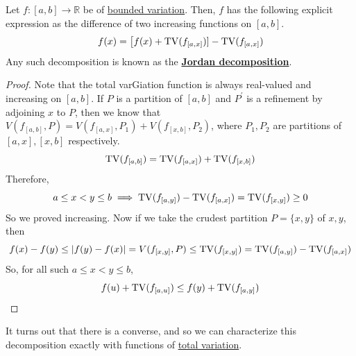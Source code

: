   \begin{lemma}
    \label{thm:construction-of-jordan-decomposition}
    Let $f: [a, b] \to \mathbb{R}$ be of \hyperref[def:bounded-variation]{bounded variation}. Then, $f$ has the following explicit expression as the difference of two increasing functions on $[a, b]$. 
    \begin{equation}
      f(x) = \big[ f(x) + \operatorname{TV} (f_{[a, x]})] - \operatorname{TV} (f_{[a, x]})
    \end{equation}
    Any such decomposition is known as the \textbf{\hyperref[thm:jordan-decomposition-theorem]{Jordan decomposition}}. 
  \end{lemma}
  \begin{proof}
    Note that the total varGiation function is always real-valued and increasing on $[a, b]$. If $P$ is a partition of $[a, b]$ and $P^\prime$ is a refinement by adjoining $x$ to $P$, then we know that $V(f_{[a, b]}, P) = V(f_{[a, x]}, P_1) + V(f_{[x, b]}, P_2)$, where $P_1, P_2$ are partitions of $[a, x], [x, b]$ respectively. 
    \begin{equation}
      \operatorname{TV} (f_{[a, b]}) = \operatorname{TV} (f_{[a, x]}) + \operatorname{TV} (f_{[x, b]})
    \end{equation}
    Therefore, 
    \begin{equation}
      a \leq x < y \leq b \implies \operatorname{TV} (f_{[a, y]}) - \operatorname{TV} (f_{[a, x]}) = \operatorname{TV} (f_{[x, y]}) \geq 0
    \end{equation}
    So we proved increasing. Now if we take the crudest partition $P = \{x, y\}$ of $x, y$, then 
    \begin{equation}
      f(x) - f(y) \leq |f(y) - f(x)| = V(f_{[x, y]}, P) \leq \operatorname{TV} (f_{[x, y]}) = \operatorname{TV}(f_{[a, y]}) - \operatorname{TV}(f_{[a, x]}) 
    \end{equation}
    So, for all such $a \leq x < y \leq b$, 
    \begin{equation}
      f(u) + \operatorname{TV}(f_{[a, u]}) \leq f(y) + \operatorname{TV}(f_{[a, y]})
    \end{equation}
  \end{proof}

  It turns out that there is a converse, and so we can characterize this decomposition exactly with functions of \hyperref[def:total-variation]{total variation}.  

